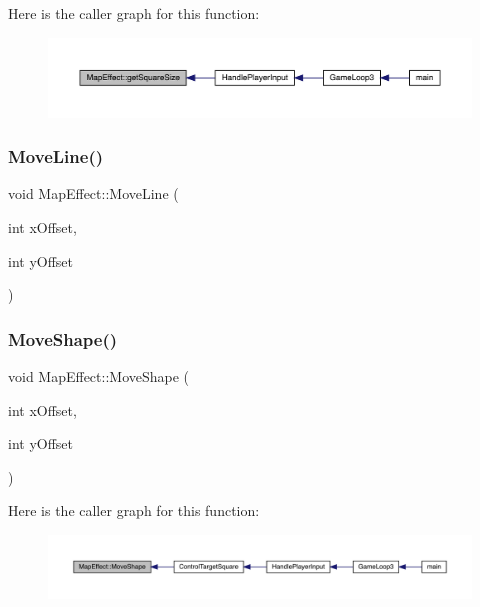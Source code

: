 Here is the caller graph for this function\+:\nopagebreak
\begin{figure}[H]
\begin{center}
\leavevmode
\includegraphics[width=350pt]{de/de4/class_map_effect_aa96fb614319095fdc9003d85ea4647e2_icgraph}
\end{center}
\end{figure}
\mbox{\label{class_map_effect_a0436f9350a55dabc183dd66024dc7895}} 
\subsubsection{\texorpdfstring{Move\+Line()}{MoveLine()}}
{\footnotesize\ttfamily void Map\+Effect\+::\+Move\+Line (\begin{DoxyParamCaption}\item[{int}]{x\+Offset,  }\item[{int}]{y\+Offset }\end{DoxyParamCaption})}

\mbox{\label{class_map_effect_a4a775648e056eda586a1d627467552d7}} 
\subsubsection{\texorpdfstring{Move\+Shape()}{MoveShape()}}
{\footnotesize\ttfamily void Map\+Effect\+::\+Move\+Shape (\begin{DoxyParamCaption}\item[{int}]{x\+Offset,  }\item[{int}]{y\+Offset }\end{DoxyParamCaption})}

Here is the caller graph for this function\+:\nopagebreak
\begin{figure}[H]
\begin{center}
\leavevmode
\includegraphics[width=350pt]{de/de4/class_map_effect_a4a775648e056eda586a1d627467552d7_icgraph}
\end{center}
\end{figure}
\mbox{\label{class_map_effect_a4782568b5d45629c080fdf183943ea29}} 
